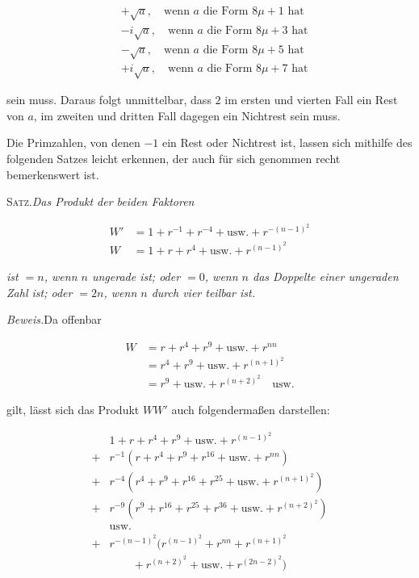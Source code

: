 \[
\begin{aligned}
&+\surd a,\quad\text{wenn }a\text{ die Form }8\mu+1\text{ hat}\\
&-i\surd a,\quad\text{wenn }a\text{ die Form }8\mu+3\text{ hat}\\
&-\surd a,\quad\text{wenn }a\text{ die Form }8\mu+5\text{ hat}\\
&+i\surd a,\quad\text{wenn }a\text{ die Form }8\mu+7\text{ hat}
\end{aligned}
\]

sein muss. Daraus folgt unmittelbar, dass $2$ im ersten und vierten Fall ein Rest von $a$, im zweiten und dritten Fall dagegen ein Nichtrest sein muss.



Die Primzahlen, von denen $-1$ ein Rest oder Nichtrest ist, lassen sich mithilfe des folgenden Satzes leicht erkennen, der auch für sich genommen recht bemerkenswert ist.

\textsc{Satz.}\quad \textit{Das Produkt der beiden Faktoren}

\[
\begin{aligned}
W'&=1+r^{-1}+r^{-4}+\text{usw.}+r^{-(n-1)^2}\\
W&=1+r+r^4+\text{usw.}+r^{(n-1)^2}
\end{aligned}
\]

\textit{ist $=n$, wenn $n$ ungerade ist; oder $=0$, wenn $n$ das Doppelte einer ungeraden Zahl ist; oder $=2n$, wenn $n$ durch vier teilbar ist.}

\textit{Beweis.}\quad Da offenbar

\[
\begin{aligned}
W&=r+r^4+r^9+\text{usw.}+r^{nn}\\
&=r^4+r^9+\text{usw.}+r^{(n+1)^2}\\
&=r^9+\text{usw.}+r^{(n+2)^2}\quad\text{usw.}
\end{aligned}
\]

gilt, lässt sich das Produkt $WW'$ auch folgendermaßen darstellen:

\[
\begin{aligned}
&1+r+r^4+r^9+\text{usw.}+r^{(n-1)^2}\\
+{}&r^{-1}(r+r^4+r^9+r^{16}+\text{usw.}+r^{nn})\\
+{}&r^{-4}(r^4+r^9+r^{16}+r^{25}+\text{usw.}+r^{(n+1)^2})\\
+{}&r^{-9}(r^9+r^{16}+r^{25}+r^{36}+\text{usw.}+r^{(n+2)^2})\\
&\text{usw.}\\
+{}&r^{-(n-1)^2}(r^{(n-1)^2}+r^{nn}+r^{(n+1)^2}\\&\qquad+r^{(n+2)^2}+\text{usw.}+r^{(2n-2)^2})
\end{aligned}
\]

